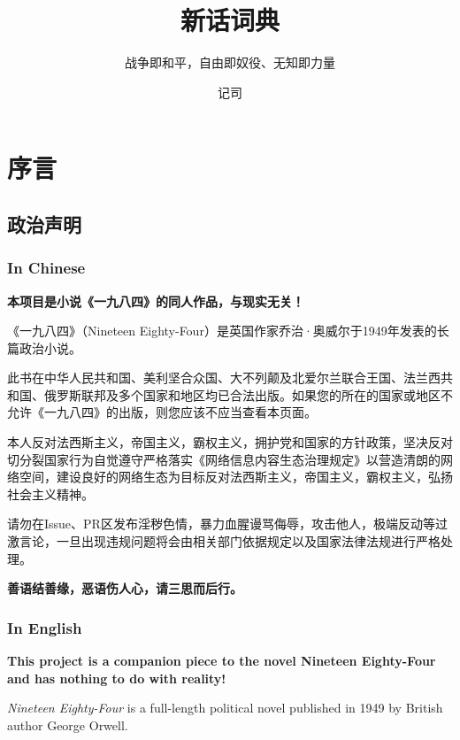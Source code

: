 \documentclass[lang=cn, color=black]{elegantbook}
\title{新话词典}
\subtitle{战争即和平，自由即奴役、无知即力量}
\author{记司}
\institute{真部}
\begin{document}
    \maketitle

    \tableofcontents

    \part*{序言}
        \chapter*{政治声明}
            \section*{In Chinese}
                \textbf{本项目是小说《一九八四》的同人作品，与现实无关！}

                《一九八四》（Nineteen Eighty-Four）是英国作家乔治·奥威尔于1949年发表的长篇政治小说。

                此书在中华人民共和国、美利坚合众国、大不列颠及北爱尔兰联合王国、法兰西共和国、俄罗斯联邦及多个国家和地区均已合法出版。如果您的所在的国家或地区不允许《一九八四》的出版，则您应该不应当查看本页面。

                本人反对法西斯主义，帝国主义，霸权主义，拥护党和国家的方针政策，坚决反对切分裂国家行为自觉遵守严格落实《网络信息内容生态治理规定》以营造清朗的网络空间，建设良好的网络生态为目标反对法西斯主义，帝国主义，霸权主义，弘扬社会主义精神。

                请勿在Issue、PR区发布淫秽色情，暴力血腥谩骂侮辱，攻击他人，极端反动等过激言论，一旦出现违规问题将会由相关部门依据规定以及国家法律法规进行严格处理。
                
                \begin{center}
                    \large
                    \textbf{善语结善缘，恶语伤人心，请三思而后行。}
                \end{center}
            
            \section*{In English}
                \textbf{This project is a companion piece to the novel Nineteen Eighty-Four and has nothing to do with reality!}

                \textit{Nineteen Eighty-Four} is a full-length political novel published in 1949 by British author George Orwell.
\end{document}
